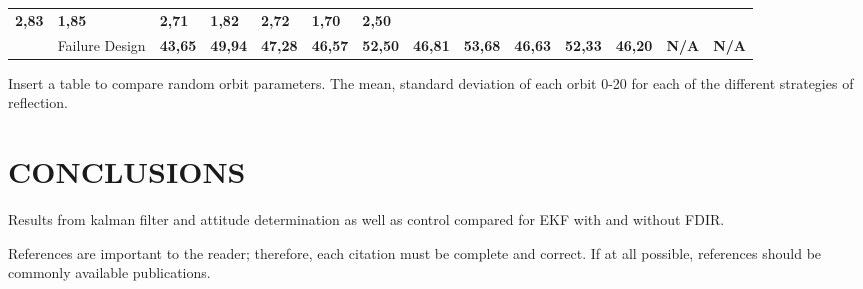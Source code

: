 \documentclass[letterpaper, 10 pt, conference]{ieeeconf}  %
\begin{document}
\begin{table*}[]
\begin{tabular}{@{}llllllllllllll@{}}
	\multicolumn{1}{l|}{\textbf{2,83}} &
	\multicolumn{1}{l|}{\textbf{1,85}} &
	\multicolumn{1}{l|}{\textbf{2,71}} &
	\multicolumn{1}{l|}{\textbf{1,82}} &
	\multicolumn{1}{l|}{\textbf{2,72}} &
	\multicolumn{1}{l|}{\textbf{1,70}} &
	\multicolumn{1}{l|}{\textbf{2,50}} \\ \cmidrule(l){2-14} 
	\multicolumn{1}{|l|}{} &
	\multicolumn{1}{l|}{Failure Design} &
	\multicolumn{1}{l|}{\textbf{43,65}} &
	\multicolumn{1}{l|}{\textbf{49,94}} &
	\multicolumn{1}{l|}{\textbf{47,28}} &
	\multicolumn{1}{l|}{\textbf{46,57}} &
	\multicolumn{1}{l|}{\textbf{52,50}} &
	\multicolumn{1}{l|}{\textbf{46,81}} &
	\multicolumn{1}{l|}{\textbf{53,68}} &
	\multicolumn{1}{l|}{\textbf{46,63}} &
	\multicolumn{1}{l|}{\textbf{52,33}} &
	\multicolumn{1}{l|}{\textbf{46,20}} &
	\multicolumn{1}{l|}{\textbf{N/A}} &
	\multicolumn{1}{l|}{\textbf{N/A}} \\ \bottomrule
\end{tabular}
\end{table*}

\newpage

Insert a table to compare random orbit parameters. The mean, standard deviation of each orbit 0-20 for each of the different strategies of reflection.

\section{CONCLUSIONS}
Results from kalman filter and attitude determination as well as control compared for EKF with and without FDIR.

\addtolength{\textheight}{-12cm}   %





References are important to the reader; therefore, each citation must be complete and correct. If at all possible, references should be commonly available publications.
\end{document}
